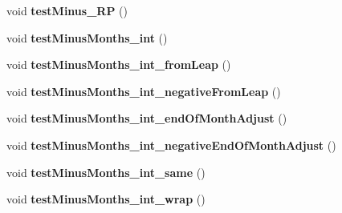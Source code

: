 \begin{DoxyCompactItemize}
\item 
\hypertarget{classorg_1_1joda_1_1time_1_1_test_month_day___basics_ac9545275d8c6c32beb74f7bf7067a812}{void {\bfseries test\-Minus\-\_\-\-R\-P} ()}\label{classorg_1_1joda_1_1time_1_1_test_month_day___basics_ac9545275d8c6c32beb74f7bf7067a812}

\item 
\hypertarget{classorg_1_1joda_1_1time_1_1_test_month_day___basics_a388f68c876ae79437f5c658fb9d6f1e9}{void {\bfseries test\-Minus\-Months\-\_\-int} ()}\label{classorg_1_1joda_1_1time_1_1_test_month_day___basics_a388f68c876ae79437f5c658fb9d6f1e9}

\item 
\hypertarget{classorg_1_1joda_1_1time_1_1_test_month_day___basics_a7ac9a69d0f8ee73c7d201654a1654ebf}{void {\bfseries test\-Minus\-Months\-\_\-int\-\_\-from\-Leap} ()}\label{classorg_1_1joda_1_1time_1_1_test_month_day___basics_a7ac9a69d0f8ee73c7d201654a1654ebf}

\item 
\hypertarget{classorg_1_1joda_1_1time_1_1_test_month_day___basics_ab0b9f58de17669241232e07b870aa5ea}{void {\bfseries test\-Minus\-Months\-\_\-int\-\_\-negative\-From\-Leap} ()}\label{classorg_1_1joda_1_1time_1_1_test_month_day___basics_ab0b9f58de17669241232e07b870aa5ea}

\item 
\hypertarget{classorg_1_1joda_1_1time_1_1_test_month_day___basics_a0ad11631c0ed91ed98e8d6bbcc1f16d7}{void {\bfseries test\-Minus\-Months\-\_\-int\-\_\-end\-Of\-Month\-Adjust} ()}\label{classorg_1_1joda_1_1time_1_1_test_month_day___basics_a0ad11631c0ed91ed98e8d6bbcc1f16d7}

\item 
\hypertarget{classorg_1_1joda_1_1time_1_1_test_month_day___basics_a524eb2472d7b0754cc1ae346550475ef}{void {\bfseries test\-Minus\-Months\-\_\-int\-\_\-negative\-End\-Of\-Month\-Adjust} ()}\label{classorg_1_1joda_1_1time_1_1_test_month_day___basics_a524eb2472d7b0754cc1ae346550475ef}

\item 
\hypertarget{classorg_1_1joda_1_1time_1_1_test_month_day___basics_a58d223fc283dca774418104dc095641b}{void {\bfseries test\-Minus\-Months\-\_\-int\-\_\-same} ()}\label{classorg_1_1joda_1_1time_1_1_test_month_day___basics_a58d223fc283dca774418104dc095641b}

\item 
\hypertarget{classorg_1_1joda_1_1time_1_1_test_month_day___basics_a00cffc1b6001fe5ade6e33709ab58cd6}{void {\bfseries test\-Minus\-Months\-\_\-int\-\_\-wrap} ()}\label{classorg_1_1joda_1_1time_1_1_test_month_day___basics_a00cffc1b6001fe5ade6e33709ab58cd6}


\end{DoxyCompactItemize}
